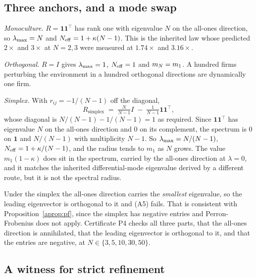 \subsection{Three anchors, and a mode swap}

\emph{Monoculture.} $R=\mathbf{1}\mathbf{1}^{\top}$ has rank one with eigenvalue $N$ on the all-ones direction, so $\lambda_{\max}=N$ and $N_{\mathrm{eff}} = 1+\kappa(N-1)$. This is the inherited law whose predicted $2\times$ and $3\times$ at $N=2,3$ were measured at $1.74\times$ and $3.16\times$.

\emph{Orthogonal.} $R=I$ gives $\lambda_{\max}=1$, $N_{\mathrm{eff}}=1$ and $m_N = m_1$. A hundred firms perturbing the environment in a hundred orthogonal directions are dynamically one firm.

\emph{Simplex.} With $r_{ij} = -1/(N-1)$ off the diagonal,
\[
  R_{\text{simplex}} \;=\; \tfrac{N}{N-1}I \;-\; \tfrac{1}{N-1}\mathbf{1}\mathbf{1}^{\top},
\]
whose diagonal is $N/(N-1) - 1/(N-1) = 1$ as required. Since $\mathbf{1}\mathbf{1}^{\top}$ has eigenvalue $N$ on the all-ones direction and $0$ on its complement, the spectrum is $0$ on $\mathbf{1}$ and $N/(N-1)$ with multiplicity $N-1$. So $\lambda_{\max} = N/(N-1)$, $N_{\mathrm{eff}} = 1 + \kappa/(N-1)$, and the radius tends to $m_1$ as $N$ grows. The value $m_1(1-\kappa)$ does sit in the spectrum, carried by the all-ones direction at $\lambda=0$, and it matches the inherited differential-mode eigenvalue derived by a different route, but it is not the spectral radius.

Under the simplex the all-ones direction carries the \emph{smallest} eigenvalue, so the leading eigenvector is orthogonal to it and (A5) fails. That is consistent with Proposition~\ref{aprop:pf}, since the simplex has negative entries and Perron-Frobenius does not apply. Certificate P4 checks all three parts, that the all-ones direction is annihilated, that the leading eigenvector is orthogonal to it, and that the entries are negative, at $N \in \{3,5,10,30,50\}$.

\subsection{A witness for strict refinement}

